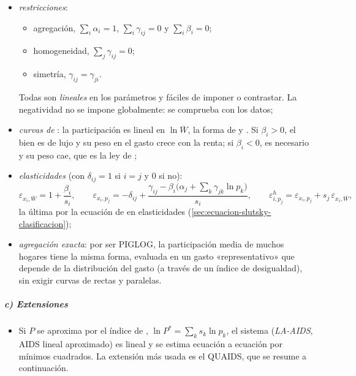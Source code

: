 \documentclass[11pt]{article}
\begin{document}
\begin{itemize}
\item \emph{restricciones}:
  \begin{itemize}
  \item agregación, $\sum_i\alpha_i=1$, $\sum_i\gamma_{ij}=0$ y $\sum_i\beta_i=0$;
  \item homogeneidad, $\sum_j\gamma_{ij}=0$;
  \item simetría, $\gamma_{ij}=\gamma_{ji}$.
  \end{itemize}
  Todas son \emph{lineales} en los parámetros y fáciles de imponer o contrastar. La negatividad no se impone globalmente: se comprueba con los datos;
\item \emph{curvas de }: la participación es lineal en $\ln\overline{W}$, la forma de \textcite{Working1943Statistical} y \textcite{Leser1963Forms}. Si $\beta_i>0$, el bien es de lujo y su peso en el gasto crece con la renta; si $\beta_i<0$, es necesario y su peso cae, que es la ley de ;
\item \emph{elasticidades} (con $\delta_{ij}=1$ si $i=j$ y $0$ si no):
  \begin{equation}
  \varepsilon_{x_i,\overline{W}}=1+\frac{\beta_i}{s_i},\qquad \varepsilon_{x_i,p_j}=-\delta_{ij}+\frac{\gamma_{ij}-\beta_i\big(\alpha_j+\sum_k\gamma_{jk}\ln p_k\big)}{s_i},\qquad \varepsilon^{h}_{i,p_j}=\varepsilon_{x_i,p_j}+s_j\,\varepsilon_{x_i,\overline{W}}, \label{eq:aids-elasticidades}
  \end{equation}
  la última por la ecuación de  en elasticidades (\ref{sec:ecuacion-slutsky-clasificacion});
\item \emph{agregación exacta}: por ser PIGLOG, la participación media de muchos hogares tiene la misma forma, evaluada en un gasto «representativo» que depende de la distribución del gasto (a través de un índice de desigualdad), sin exigir curvas de  rectas y paralelas.
\end{itemize}

\subparagraph{c) Extensiones}

\begin{itemize}
\item Si $P$ se aproxima por el índice de , $\ln P^*=\sum_ks_k\ln p_k$, el sistema (\emph{LA-AIDS}, AIDS lineal aproximado) es lineal y se estima ecuación a ecuación por mínimos cuadrados. La extensión más usada es el QUAIDS, que se resume a continuación.
\end{itemize}
\end{document}
